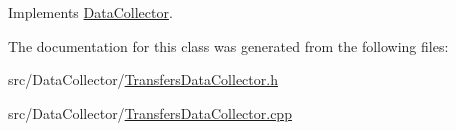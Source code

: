Implements \mbox{\hyperlink{classDataCollector_af01ea961314be2164f39e6d4cd59e443}{Data\+Collector}}.



The documentation for this class was generated from the following files\+:\begin{DoxyCompactItemize}
\item 
src/\+Data\+Collector/\mbox{\hyperlink{TransfersDataCollector_8h}{Transfers\+Data\+Collector.\+h}}\item 
src/\+Data\+Collector/\mbox{\hyperlink{TransfersDataCollector_8cpp}{Transfers\+Data\+Collector.\+cpp}}\end{DoxyCompactItemize}
